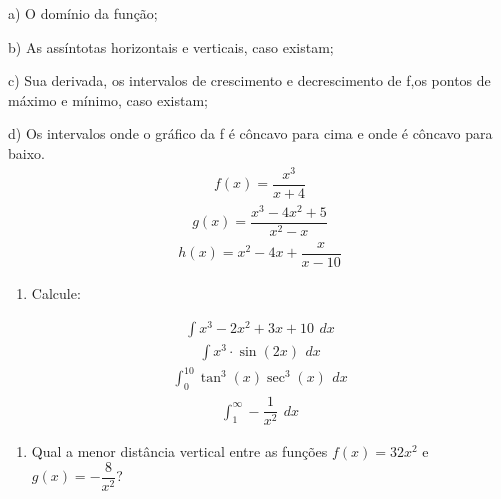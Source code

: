 \documentclass[letterpaper,10pt,english]{jupyterBook}
\begin{document}
\sphinxAtStartPar
a) O domínio da função;

\sphinxAtStartPar
b) As assíntotas horizontais e verticais, caso existam;

\sphinxAtStartPar
c) Sua derivada, os intervalos de crescimento e decrescimento de f,os pontos de máximo e mínimo, caso existam;

\sphinxAtStartPar
d) Os intervalos onde o gráfico da f é côncavo para cima e onde é côncavo para baixo.
\begin{equation*}
\begin{split}f(x) = \dfrac{x^3}{x + 4}\end{split}
\end{equation*}\begin{equation*}
\begin{split}g(x) = \dfrac{x^3 - 4x^2 + 5}{x^2 - x}\end{split}
\end{equation*}\begin{equation*}
\begin{split}h(x) = x^2 - 4x + \dfrac{x}{x-10}\end{split}
\end{equation*}\begin{enumerate}
%
\item {} 
\sphinxAtStartPar
Calcule:

\end{enumerate}
\begin{equation*}
\begin{split}\int x^3 - 2x^2 + 3x + 10 \,\ dx\end{split}
\end{equation*}\begin{equation*}
\begin{split}\int x^3\cdot\sin(2x) \,\ dx\end{split}
\end{equation*}\begin{equation*}
\begin{split}\int_0^{10} \tan^3(x)\sec^3(x) \,\ dx \end{split}
\end{equation*}\begin{equation*}
\begin{split}\int_1^{\infty} -\dfrac{1}{x^2} \,\ dx \end{split}
\end{equation*}\begin{enumerate}
%
\item {} 
\sphinxAtStartPar
Qual a menor distância vertical entre as funções \(f(x) = 32x^2\) e \(g(x) = -\dfrac{8}{x^2}\)?

\end{enumerate}
\end{document}
